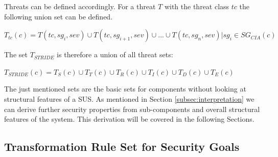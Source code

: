%
% 
%
%
%

Threats can be defined accordingly. For a threat $T$ with the threat class $tc$ the following union set can be defined. 

\begin{theorem} 
$T_{tc}(c) = T(tc, sg_i, sev) \cup T(tc, sg_{i+1}, sev) \cup ... \cup T(tc, sg_n, sev) | sg_i \in SG_{CIA}(c)$
\end{theorem}

The set $T_{STRIDE}$ is therefore a union of all threat sets:

\begin{theorem} 
$T_{STRIDE}(c) = T_S(c) \cup T_T(c) \cup T_R(c) \cup T_I(c) \cup T_D(c) \cup T_E(c)$
\end{theorem}

The just mentioned sets are the basic sets for components without looking at structural features of a SUS. As mentioned in Section \ref{subsec:interpretation} we can derive further security properties from sub-components and overall structural features of the system. This derivation will be covered in the following Sections.

\subsection{Transformation Rule Set for Security Goals}
\label{subsec:sec_goals_rules}

